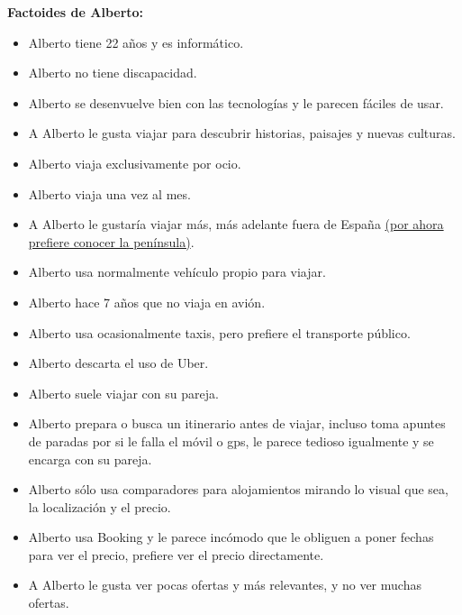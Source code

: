 \textbf{Factoides de Alberto:}

\begin{itemize}
    \item Alberto tiene 22 años y es informático.
    \item Alberto no tiene discapacidad.
    \item Alberto se desenvuelve bien con las tecnologías y le parecen fáciles de usar.
    \item A Alberto le gusta viajar para descubrir historias, paisajes y nuevas culturas.
    \item Alberto viaja exclusivamente por ocio.
    \item Alberto viaja una vez al mes.
    \item A Alberto le gustaría viajar más, más adelante fuera de España \underline{(por ahora prefiere conocer la península)}.
    \item Alberto usa normalmente vehículo propio para viajar.
    \item Alberto hace 7 años que no viaja en avión.
    \item Alberto usa ocasionalmente taxis, pero prefiere el transporte público.
    \item Alberto descarta el uso de Uber.
    \item Alberto suele viajar con su pareja.
    \item Alberto prepara o busca un itinerario antes de viajar, incluso toma apuntes de paradas por si le falla el móvil o gps, le parece tedioso igualmente y se encarga con su pareja.
    \item Alberto sólo usa comparadores para alojamientos mirando lo visual que sea, la localización y el precio.
    \item Alberto usa Booking y le parece incómodo que le obliguen a poner fechas para ver el precio, prefiere ver el precio directamente.
    \item A Alberto le gusta ver pocas ofertas y más relevantes, y no ver muchas ofertas.
\end{itemize}



